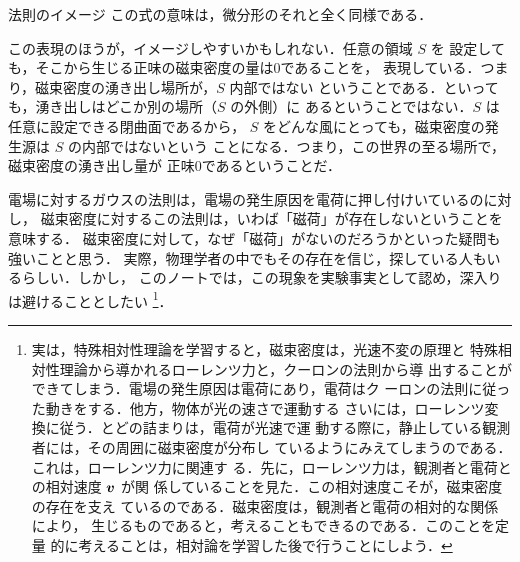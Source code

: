             \begin{mysmallsec}{法則のイメージ}
                この式の意味は，微分形のそれと全く同様である．

                この表現のほうが，イメージしやすいかもしれない．任意の領域 $S$ を
                設定しても，そこから生じる正味の磁束密度の量は0であることを，
                表現している．つまり，磁束密度の湧き出し場所が，$S$ 内部ではない
                ということである．といっても，湧き出しはどこか別の場所（$S$ の外側）に
                あるということではない．$S$ は任意に設定できる閉曲面であるから，
                $S$ をどんな風にとっても，磁束密度の発生源は $S$ の内部ではないという
                ことになる．つまり，この世界の至る場所で，磁束密度の湧き出し量が
                正味0であるということだ．

                電場に対するガウスの法則は，電場の発生原因を電荷に押し付けいているのに対し，
                磁束密度に対するこの法則は，いわば「磁荷」が存在しないということを意味する．
                磁束密度に対して，なぜ「磁荷」がないのだろうかといった疑問も強いことと思う．
                実際，物理学者の中でもその存在を信じ，探している人もいるらしい．しかし，
                このノートでは，この現象を実験事実として認め，深入りは避けることとしたい
                    \footnote{
                        実は，特殊相対性理論を学習すると，磁束密度は，光速不変の原理と
                        特殊相対性理論から導かれるローレンツ力と，クーロンの法則から導
                        出することができてしまう．電場の発生原因は電荷にあり，電荷はク
                        ーロンの法則に従った動きをする．他方，物体が光の速さで運動する
                        さいには，ローレンツ変換に従う．とどの詰まりは，電荷が光速で運
                        動する際に，静止している観測者には，その周囲に磁束密度が分布し
                        ているようにみえてしまうのである．これは，ローレンツ力に関連す
                        る．先に，ローレンツ力は，観測者と電荷との相対速度 $\boldsymbol{v}$ が関
                        係していることを見た．この相対速度こそが，磁束密度の存在を支え
                        ているのである．磁束密度は，観測者と電荷の相対的な関係により，
                        生じるものであると，考えることもできるのである．このことを定量
                        的に考えることは，相対論を学習した後で行うことにしよう．
                    }．
            \end{mysmallsec}

